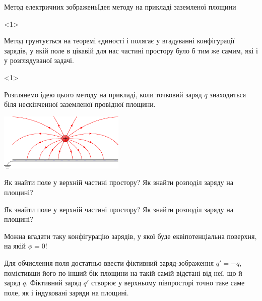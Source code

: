 \documentclass{beamer}
\begin{document}
\begin{frame}{Метод електричних зображень}{Ідея методу на прикладі заземленої площини}
	\begin{onlyenv}
		\begin{block}{}\justifying\small
			Метод \alert{грунтується на теоремі єдиності} і \alert{полягає у вгадуванні
				конфігурації зарядів}, у якій поле в цікавій для нас частині простору було б тим же
			самим, які і у розглядуваної задачі.
		\end{block}
	\end{onlyenv}
	\begin{onlyenv}
		\begin{block}{}\justifying\scriptsize
			Розглянемо ідею цього методу на прикладі, коли точковий заряд $q$
			знаходиться	біля нескінченної заземленої провідної площини.
		\end{block}
		\begin{center}
			\includegraphics[width=6cm]{charge_near_plane.pdf}
		\end{center}
		\begin{alertblock}{}
			Як знайти поле у верхній частині простору? Як знайти розподіл заряду на площині?
		\end{alertblock}
	\end{onlyenv}
	\begin{overprint}
		\begin{alertblock}{}
			Як знайти поле у верхній частині простору? Як знайти розподіл заряду на площині?
		\end{alertblock}
		\begin{alertblock}{}
			Можна вгадати таку конфігурацію зарядів, у якої буде еквіпотенціальна поверхня, на якій
			$\phi = 0$!
		\end{alertblock}
		\begin{block}{}\justifying\small
			Для обчислення поля достатньо ввести \alert{фіктивний заряд-зображення $q' = -q$},
			помістивши його по інший бік площини на такій самій відстані від неї, що й заряд $q$.
			Фіктивний заряд $q'$ створює у верхньому півпросторі точно таке саме поле, як і індуковані
			заряди на площині.
		\end{block}
	\end{overprint}


\end{frame}
\end{document}
